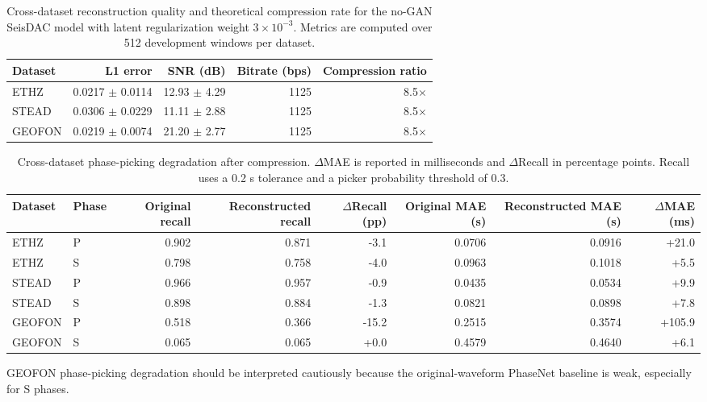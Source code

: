 \begin{table}[t]
\centering
\caption{Cross-dataset reconstruction quality and theoretical compression rate for the no-GAN SeisDAC model with latent regularization weight $3\times10^{-3}$. Metrics are computed over 512 development windows per dataset.}
\label{tab:multidataset_reconstruction}
\begin{tabular}{lrrrr}
\toprule
Dataset & L1 error & SNR (dB) & Bitrate (bps) & Compression ratio \\
\midrule
ETHZ & 0.0217 $\pm$ 0.0114 & 12.93 $\pm$ 4.29 & 1125 & 8.5$\times$ \\
STEAD & 0.0306 $\pm$ 0.0229 & 11.11 $\pm$ 2.88 & 1125 & 8.5$\times$ \\
GEOFON & 0.0219 $\pm$ 0.0074 & 21.20 $\pm$ 2.77 & 1125 & 8.5$\times$ \\
\bottomrule
\end{tabular}
\end{table}

\begin{table}[t]
\centering
\caption{Cross-dataset phase-picking degradation after compression. $\Delta$MAE is reported in milliseconds and $\Delta$Recall in percentage points. Recall uses a 0.2 s tolerance and a picker probability threshold of 0.3.}
\label{tab:multidataset_picking_degradation}
\begin{tabular}{llrrrrrr}
\toprule
Dataset & Phase & Original recall & Reconstructed recall & $\Delta$Recall (pp) & Original MAE (s) & Reconstructed MAE (s) & $\Delta$MAE (ms) \\
\midrule
ETHZ & P & 0.902 & 0.871 & -3.1 & 0.0706 & 0.0916 & +21.0 \\
ETHZ & S & 0.798 & 0.758 & -4.0 & 0.0963 & 0.1018 & +5.5 \\
STEAD & P & 0.966 & 0.957 & -0.9 & 0.0435 & 0.0534 & +9.9 \\
STEAD & S & 0.898 & 0.884 & -1.3 & 0.0821 & 0.0898 & +7.8 \\
GEOFON & P & 0.518 & 0.366 & -15.2 & 0.2515 & 0.3574 & +105.9 \\
GEOFON & S & 0.065 & 0.065 & +0.0 & 0.4579 & 0.4640 & +6.1 \\
\bottomrule
\end{tabular}
\begin{flushleft}
\footnotesize GEOFON phase-picking degradation should be interpreted cautiously because the original-waveform PhaseNet baseline is weak, especially for S phases.
\end{flushleft}
\end{table}
